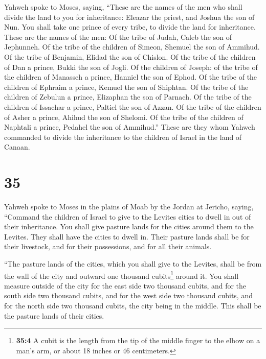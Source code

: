  Yahweh spoke to Moses, saying,  ``These
are the names of the men who shall divide the land to you for
inheritance: Eleazar the priest, and Joshua the son of Nun.
 You shall take one prince of every tribe, to divide the
land for inheritance.  These are the names of the men: Of
the tribe of Judah, Caleb the son of Jephunneh.  Of the
tribe of the children of Simeon, Shemuel the son of Ammihud.
 Of the tribe of Benjamin, Elidad the son of Chislon.
 Of the tribe of the children of Dan a prince, Bukki the
son of Jogli.  Of the children of Joseph: of the tribe of
the children of Manasseh a prince, Hanniel the son of Ephod.
 Of the tribe of the children of Ephraim a prince, Kemuel
the son of Shiphtan.  Of the tribe of the children of
Zebulun a prince, Elizaphan the son of Parnach.  Of the
tribe of the children of Issachar a prince, Paltiel the son of Azzan.
 Of the tribe of the children of Asher a prince, Ahihud
the son of Shelomi.  Of the tribe of the children of
Naphtali a prince, Pedahel the son of Ammihud.''  These
are they whom Yahweh commanded to divide the inheritance to the children
of Israel in the land of Canaan.

\hypertarget{section-34}{%
\section{35}\label{section-34}}

 Yahweh spoke to Moses in the plains of Moab by the Jordan
at Jericho, saying,  ``Command the children of Israel to
give to the Levites cities to dwell in out of their inheritance. You
shall give pasture lands for the cities around them to the Levites.
 They shall have the cities to dwell in. Their pasture
lands shall be for their livestock, and for their possessions, and for
all their animals.

 ``The pasture lands of the cities, which you shall give
to the Levites, shall be from the wall of the city and outward one
thousand cubits\footnote{\textbf{35:4} A cubit is the length from the
  tip of the middle finger to the elbow on a man's arm, or about 18
  inches or 46 centimeters.} around it.  You shall measure
outside of the city for the east side two thousand cubits, and for the
south side two thousand cubits, and for the west side two thousand
cubits, and for the north side two thousand cubits, the city being in
the middle. This shall be the pasture lands of their cities.

